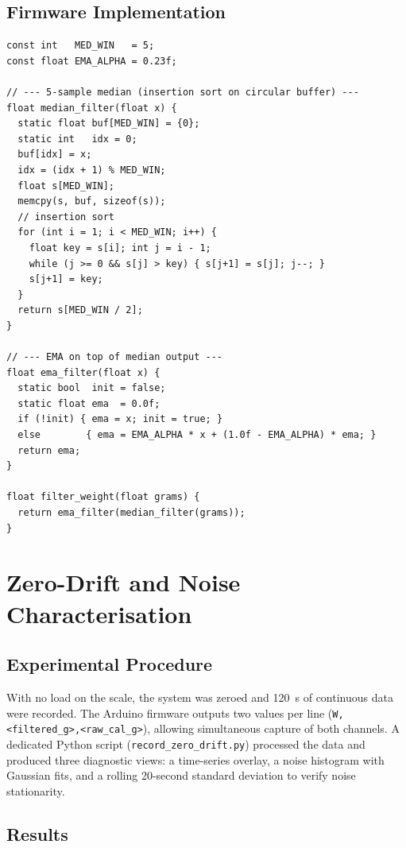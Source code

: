 \documentclass[12pt,a4paper]{article}
\begin{document}
\subsection{Firmware Implementation}

\begin{lstlisting}[style=cppstyle, caption={Two-stage median + EMA filter (Arduino firmware).}]
const int   MED_WIN   = 5;
const float EMA_ALPHA = 0.23f;

// --- 5-sample median (insertion sort on circular buffer) ---
float median_filter(float x) {
  static float buf[MED_WIN] = {0};
  static int   idx = 0;
  buf[idx] = x;
  idx = (idx + 1) % MED_WIN;
  float s[MED_WIN];
  memcpy(s, buf, sizeof(s));
  // insertion sort
  for (int i = 1; i < MED_WIN; i++) {
    float key = s[i]; int j = i - 1;
    while (j >= 0 && s[j] > key) { s[j+1] = s[j]; j--; }
    s[j+1] = key;
  }
  return s[MED_WIN / 2];
}

// --- EMA on top of median output ---
float ema_filter(float x) {
  static bool  init = false;
  static float ema  = 0.0f;
  if (!init) { ema = x; init = true; }
  else        { ema = EMA_ALPHA * x + (1.0f - EMA_ALPHA) * ema; }
  return ema;
}

float filter_weight(float grams) {
  return ema_filter(median_filter(grams));
}
\end{lstlisting}

\section{Zero-Drift and Noise Characterisation}
\label{sec:zero_drift}

\subsection{Experimental Procedure}

With no load on the scale, the system was zeroed and \SI{120}{s} of continuous data
were recorded. The Arduino firmware outputs two values per line
(\texttt{W,<filtered\_g>,<raw\_cal\_g>}), allowing simultaneous capture of both
channels. A dedicated Python script (\texttt{record\_zero\_drift.py}) processed the
data and produced three diagnostic views: a time-series overlay, a noise histogram with
Gaussian fits, and a rolling 20-second standard deviation to verify noise stationarity.

\subsection{Results}
\end{document}
